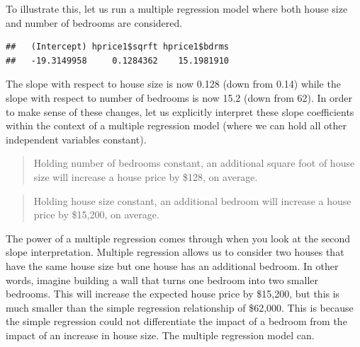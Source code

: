 \documentclass[
]{book}
\newenvironment{Shaded}{\begin{snugshade}}{\end{snugshade}}
\newcommand{\FunctionTok}[1]{\textcolor[rgb]{0.00,0.00,0.00}{#1}}
\newcommand{\NormalTok}[1]{#1}
\newcommand{\OtherTok}[1]{\textcolor[rgb]{0.56,0.35,0.01}{#1}}
\newcommand{\SpecialCharTok}[1]{\textcolor[rgb]{0.00,0.00,0.00}{#1}}
\begin{document}
To illustrate this, let us run a multiple regression model where both house size and number of bedrooms are considered.

\begin{Shaded}
\end{Shaded}

\begin{verbatim}
##   (Intercept) hprice1$sqrft hprice1$bdrms 
##   -19.3149958     0.1284362    15.1981910
\end{verbatim}

The slope with respect to house size is now 0.128 (down from 0.14) while the slope with respect to number of bedrooms is now 15.2 (down from 62). In order to make sense of these changes, let us explicitly interpret these slope coefficients within the context of a multiple regression model (where we can hold all other independent variables constant).

\begin{quote}
Holding number of bedrooms constant, an additional square foot of house size will increase a house price by \$128, on average.
\end{quote}

\begin{quote}
Holding house size constant, an additional bedroom will increase a house price by \$15,200, on average.
\end{quote}

The power of a multiple regression comes through when you look at the second slope interpretation. Multiple regression allows us to consider two houses that have the same house size but one house has an additional bedroom. In other words, imagine building a wall that turns one bedroom into two smaller bedrooms. This will increase the expected house price by \$15,200, but this is much smaller than the simple regression relationship of \$62,000. This is because the simple regression could not differentiate the impact of a bedroom from the impact of an increase in house size. The multiple regression model can.
\end{document}
